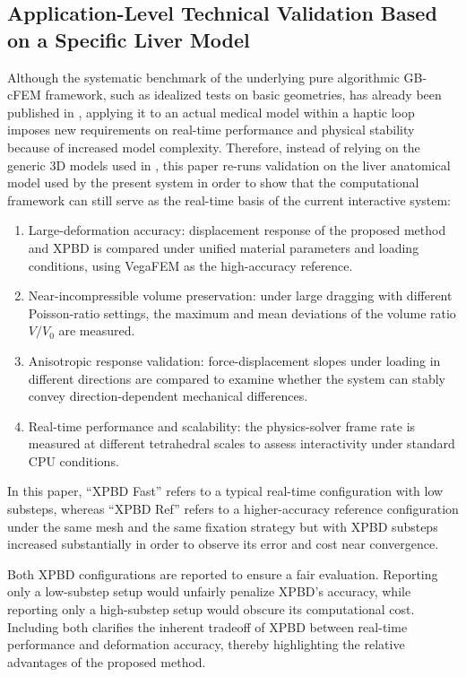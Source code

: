 \documentclass{ieeeaccess}
\begin{document}
\subsection{Application-Level Technical Validation Based on a Specific Liver Model}
Although the systematic benchmark of the underlying pure algorithmic GB-cFEM framework, such as idealized tests on basic geometries, has already been published in \cite{wang2025group}, applying it to an actual medical model within a haptic loop imposes new requirements on real-time performance and physical stability because of increased model complexity. Therefore, instead of relying on the generic 3D models used in \cite{wang2025group}, this paper re-runs validation on the liver anatomical model used by the present system in order to show that the computational framework can still serve as the real-time basis of the current interactive system:
\begin{enumerate}
\item Large-deformation accuracy: displacement response of the proposed method and XPBD is compared under unified material parameters and loading conditions, using VegaFEM as the high-accuracy reference.
\item Near-incompressible volume preservation: under large dragging with different Poisson-ratio settings, the maximum and mean deviations of the volume ratio $V/V_0$ are measured.
\item Anisotropic response validation: force-displacement slopes under loading in different directions are compared to examine whether the system can stably convey direction-dependent mechanical differences.
\item Real-time performance and scalability: the physics-solver frame rate is measured at different tetrahedral scales to assess interactivity under standard CPU conditions.
\end{enumerate}

In this paper, ``XPBD Fast'' refers to a typical real-time configuration with low substeps, whereas ``XPBD Ref'' refers to a higher-accuracy reference configuration under the same mesh and the same fixation strategy but with XPBD substeps increased substantially in order to observe its error and cost near convergence.

Both XPBD configurations are reported to ensure a fair evaluation. Reporting only a low-substep setup would unfairly penalize XPBD's accuracy, while reporting only a high-substep setup would obscure its computational cost. Including both clarifies the inherent tradeoff of XPBD between real-time performance and deformation accuracy, thereby highlighting the relative advantages of the proposed method.
\end{document}

